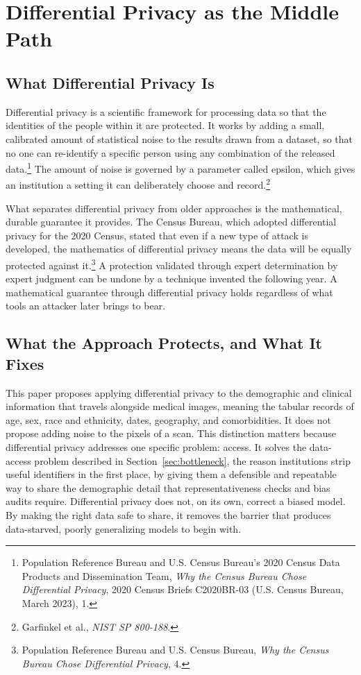 \documentclass[11pt]{article}
\begin{document}
\section{Differential Privacy as the Middle Path}

\subsection{What Differential Privacy Is}

Differential privacy is a scientific framework for processing data so that the identities of the people within it are protected. It works by adding a small, calibrated amount of statistical noise to the results drawn from a dataset, so that no one can re-identify a specific person using any combination of the released data.\footnote{Population Reference Bureau and U.S. Census Bureau's 2020 Census Data Products and Dissemination Team, \textit{Why the Census Bureau Chose Differential Privacy}, 2020 Census Briefs C2020BR-03 (U.S. Census Bureau, March 2023), 1.} The amount of noise is governed by a parameter called epsilon, which gives an institution a setting it can deliberately choose and record.\footnote{Garfinkel et al., \textit{NIST SP 800-188}.} 

What separates differential privacy from older approaches is the mathematical, durable guarantee it provides. The Census Bureau, which adopted differential privacy for the 2020 Census, stated that even if a new type of attack is developed, the mathematics of differential privacy means the data will be equally protected against it.\footnote{Population Reference Bureau and U.S. Census Bureau, \textit{Why the Census Bureau Chose Differential Privacy}, 4.} A protection validated through expert determination by expert judgment can be undone by a technique invented the following year. A mathematical guarantee through differential privacy holds regardless of what tools an attacker later brings to bear.

\subsection{What the Approach Protects, and What It Fixes}

This paper proposes applying differential privacy to the demographic and clinical information that travels alongside medical images, meaning the tabular records of age, sex, race and ethnicity, dates, geography, and comorbidities. It does not propose adding noise to the pixels of a scan. This distinction matters because differential privacy addresses one specific problem: access. It solves the data-access problem described in Section~\ref{sec:bottleneck}, the reason institutions strip useful identifiers in the first place, by giving them a defensible and repeatable way to share the demographic detail that representativeness checks and bias audits require. Differential privacy does not, on its own, correct a biased model. By making the right data safe to share, it removes the barrier that produces data-starved, poorly generalizing models to begin with.
\end{document}
